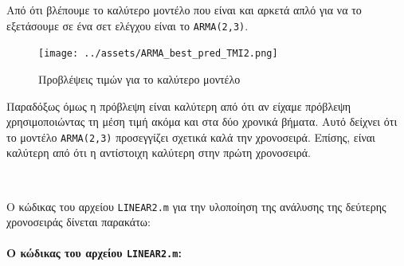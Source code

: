 \documentclass[11pt,]{article}
\let\oldparagraph\paragraph
\renewcommand{\paragraph}[1]{\oldparagraph{#1}\mbox{}}
\begin{document}
Από ότι βλέπουμε το καλύτερο μοντέλο που είναι και αρκετά απλό για να το
εξετάσουμε σε ένα σετ ελέγχου είναι το \texttt{ARMA(2,3)}.

\begin{figure}
\centering
\texttt{[image: ../assets/ARMA\_best\_pred\_TMI2.png]}
\caption{Προβλέψεις τιμών για το καλύτερο μοντέλο}
\end{figure}

Παραδόξως όμως η πρόβλεψη είναι καλύτερη από ότι αν είχαμε πρόβλεψη
χρησιμοποιώντας τη μέση τιμή ακόμα και στα δύο χρονικά βήματα. Αυτό
δείχνει ότι το μοντέλο \texttt{ARMA(2,3)} προσεγγίζει σχετικά καλά την
χρονοσειρά. Επίσης, είναι καλύτερη από ότι η αντίστοιχη καλύτερη στην
πρώτη χρονοσειρά.

~

Ο κώδικας του αρχείου \texttt{LINEAR2.m} για την υλοποίηση της ανάλυσης
της δεύτερης χρονοσειράς δίνεται παρακάτω:

\hypertarget{ux3bf-ux3baux3ceux3b4ux3b9ux3baux3b1ux3c2-ux3c4ux3bfux3c5-ux3b1ux3c1ux3c7ux3b5ux3afux3bfux3c5-linear2.m}{%
\paragraph{\texorpdfstring{Ο κώδικας του αρχείου
\texttt{LINEAR2.m}:}{Ο κώδικας του αρχείου LINEAR2.m:}}\label{ux3bf-ux3baux3ceux3b4ux3b9ux3baux3b1ux3c2-ux3c4ux3bfux3c5-ux3b1ux3c1ux3c7ux3b5ux3afux3bfux3c5-linear2.m}}
\end{document}
